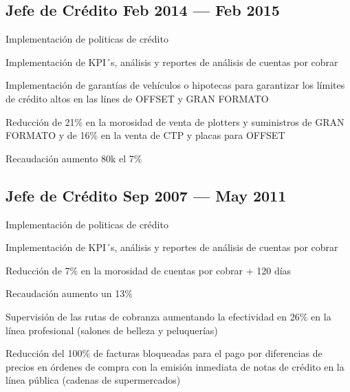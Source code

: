 \subsection{\texorpdfstring{Jefe de Crédito \hfill Feb 2014 --- Feb 2015}{Subgerente Dic 2015 --- Jun 2016}}
\begin{zitemize}
\item Implementación de politicas de crédito
\item Implementación de KPI´s, análisis  y reportes de análisis de cuentas por cobrar
\item Implementación de garantías de vehículos o hipotecas para garantizar los límites de crédito altos en las línes de OFFSET y GRAN FORMATO 
\item Reducción de 21\%  en la morosidad de venta de plotters y suministros de GRAN FORMATO y de 16\% en la venta de CTP y placas para OFFSET
\item Recaudación aumento 80k el 7\%
\end{zitemize}

\subsection{\texorpdfstring{Jefe de Crédito \hfill Sep 2007 --- May 2011}{Jefe de Crédito Sep 2007 --- May 2011}}
\begin{zitemize}
\item Implementación de politicas de crédito
\item Implementación de KPI´s, análisis  y reportes de análisis de cuentas por cobrar
\item Reducción de 7\%  en la morosidad de cuentas por cobrar + 120 días
\item Recaudación aumento un 13\%
\item Supervisión de las rutas de cobranza aumentando la efectividad en 26\% en la línea profesional (salones de belleza y peluquerías)
\item Reducción del 100\% de facturas bloqueadas para el pago por diferencias de precios en órdenes de compra con la emisión inmediata de notas de crédito en la línea pública (cadenas de supermercados)
\end{zitemize}

